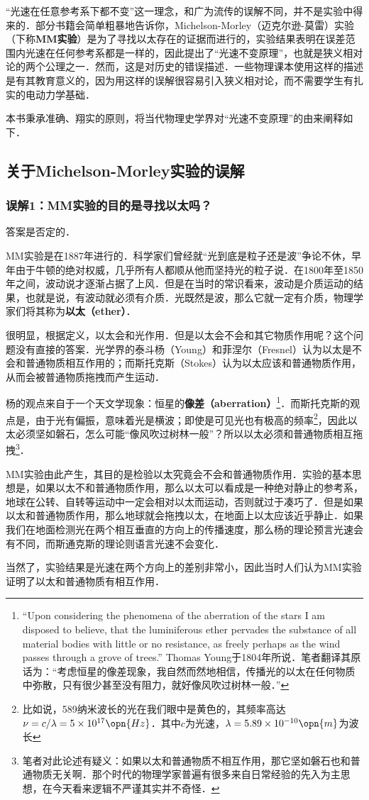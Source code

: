 
“光速在任意参考系下都不变”这一理念，和广为流传的误解不同，并不是实验中得来的．部分书籍会简单粗暴地告诉你，Michelson-Morley（迈克尔逊-莫雷）实验（下称\textbf{MM实验}）是为了寻找以太存在的证据而进行的，实验结果表明在误差范围内光速在任何参考系都是一样的，因此提出了“光速不变原理”，也就是狭义相对论的两个公理之一．然而，这是对历史的错误描述．一些物理课本使用这样的描述是有其教育意义的，因为用这样的误解很容易引入狭义相对论，而不需要学生有扎实的电动力学基础．

本书秉承准确、翔实的原则，将当代物理史学界对“光速不变原理”的由来阐释如下．

\subsection{关于Michelson-Morley实验的误解}

\subsubsection{误解1：MM实验的目的是寻找以太吗？}

答案是否定的．

MM实验是在1887年进行的．科学家们曾经就“光到底是粒子还是波”争论不休，早年由于牛顿的绝对权威，几乎所有人都顺从他而坚持光的粒子说．在1800年至1850年之间，波动说才逐渐占据了上风．但是在当时的常识看来，波动是介质运动的结果，也就是说，有波动就必须有介质．光既然是波，那么它就一定有介质，物理学家们将其称为\textbf{以太（ether）}．

很明显，根据定义，以太会和光作用．但是以太会不会和其它物质作用呢？这个问题没有直接的答案．光学界的泰斗杨（Young）和菲涅尔（Fresnel）认为以太是不会和普通物质相互作用的；而斯托克斯（Stokes）认为以太应该和普通物质作用，从而会被普通物质拖拽而产生运动．

杨的观点来自于一个天文学现象：恒星的\textbf{像差（aberration）}\footnote{“Upon considering the phenomena
of the aberration of the stars I am disposed to believe, that the luminiferous ether pervades the substance of all material bodies with little or no resistance, as freely perhaps as the wind passes through a grove of trees.” Thomas Young于1804年所说．笔者翻译其原话为：“考虑恒星的像差现象，我自然而然地相信，传播光的以太在任何物质中弥散，只有很少甚至没有阻力，就好像风吹过树林一般．”}．而斯托克斯的观点是，由于光有偏振，意味着光是横波；即使是可见光也有极高的频率\footnote{比如说，589纳米波长的光在我们眼中是黄色的，其频率高达$\nu=c/\lambda=5\times10^{17}\opn{Hz}$．其中$c$为光速，$\lambda=5.89\times10^{-10}\opn{m}$为波长}，因此以太必须坚如磐石，怎么可能“像风吹过树林一般”？所以以太必须和普通物质相互拖拽\footnote{笔者对此论述有疑义：如果以太和普通物质不相互作用，那它坚如磐石也和普通物质无关啊．那个时代的物理学家普遍有很多来自日常经验的先入为主思想，在今天看来逻辑不严谨其实并不奇怪．}．%

MM实验由此产生，其目的是检验以太究竟会不会和普通物质作用．实验的基本思想是，如果以太不和普通物质作用，那么以太可以看成是一种绝对静止的参考系，地球在公转、自转等运动中一定会相对以太而运动，否则就过于凑巧了．但是如果以太和普通物质作用，那么地球就会拖拽以太，在地面上以太应该近乎静止．如果我们在地面检测光在两个相互垂直的方向上的传播速度，那么杨的理论预言光速会有不同，而斯通克斯的理论则语言光速不会变化．

当然了，实验结果是光速在两个方向上的差别非常小，因此当时人们认为MM实验证明了以太和普通物质有相互作用．


